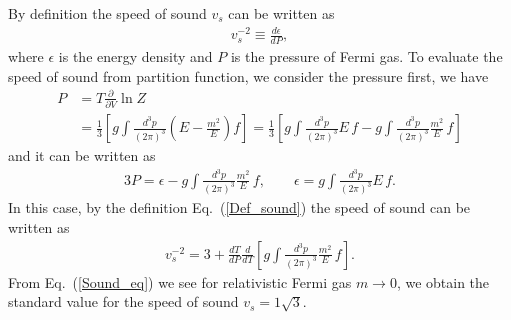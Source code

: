 \documentclass[sn-mathphys,Numbered]{sn-jnl}
\theoremstyle{thmstyleone}%
\theoremstyle{thmstyletwo}%
\theoremstyle{thmstylethree}%
\begin{document}
By definition the speed of sound $v_s$ can be written as
\begin{align}\label{Def_sound}
v^{-2}_s\equiv\frac{d\epsilon}{dP},
\end{align}
where $\epsilon$ is the energy density and $P$ is the pressure of Fermi gas. To evaluate the speed of sound from partition function, we consider the pressure  first, we have
\begin{align}
P&=T\frac{\partial}{\partial V} \ln{Z}\\
&=\frac{1}{3}\left[g\int\!\!\frac{d^3p}{(2\pi)^3}\left(E-\frac{m^2}{E}\right)f\right]=\frac{1}{3}\left[g\int\!\!\frac{d^3p}{(2\pi)^3}E\,f-g\int\!\!\frac{d^3p}{(2\pi)^3}\frac{m^2}{E}\,f\right]
\end{align}
and it can be written as
\begin{align}
3P=\epsilon-g\int\frac{d^3p}{(2\pi)^3}\frac{m^2}{E}\,f,\qquad \epsilon=g\int\frac{d^3p}{(2\pi)^3}E\,f.
\end{align}
In this case, by the definition Eq.~(\ref{Def_sound}) the speed of sound can be written as
\begin{align}\label{Sound_eq}
v^{-2}_s=3+\frac{dT}{dP}\frac{d}{dT}\left[g\int\!\!\frac{d^3p}{(2\pi)^3}\frac{m^2}{E}\,f\right].
\end{align}
From Eq.~(\ref{Sound_eq}) we see for relativistic Fermi gas $m\to 0$, we obtain the standard value for the speed of sound $v_s=1\sqrt{3}$.
\end{document}

